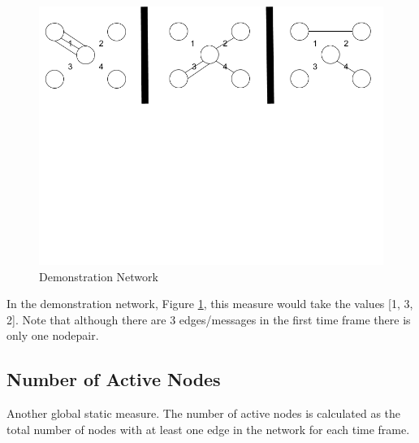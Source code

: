 \begin{figure}[h!]
  \begin{center}
  \includegraphics[trim={0 11cm 0 0}, clip, width=140mm]{./Figures/globalMeasuresReferenceNetwork.png}
  \end{center}
  \caption{Demonstration Network}
  \label{fig:demonstrationNetwork}
\end{figure}


In the demonstration network, Figure \ref{fig:demonstrationNetwork}, this measure would take the values [1, 3, 2]. Note that although there are 3 edges/messages in the first time frame there is only one nodepair.



\subsection{Number of Active Nodes}
Another global static measure. The number of active nodes is calculated as the total number of nodes with at least one edge in the network for each time frame.

